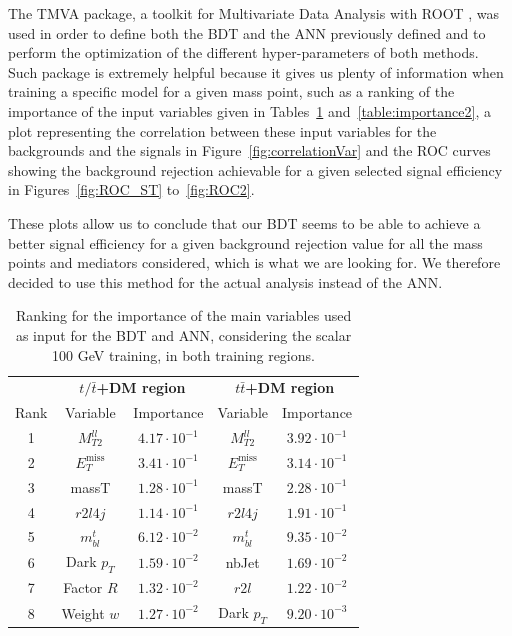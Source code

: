 \documentclass[a4paper, 10pt, openright]{report}
\begin{document}
The TMVA package, a toolkit for Multivariate Data Analysis with ROOT \cite{TMVA}, was used in order to define both the \ac{BDT} and the \ac{ANN} previously defined and to perform the optimization of the different hyper-parameters of both methods. Such package is extremely helpful because it gives us plenty of information when training a specific model for a given mass point, such as a ranking of the importance of the input variables given in Tables~\ref{table:importance1} and~\ref{table:importance2}, a plot representing the correlation between these input variables for the backgrounds and the signals in Figure~\ref{fig:correlationVar} and the \ac{ROC} curves showing the background rejection achievable for a given selected signal efficiency in Figures~\ref{fig:ROC_ST} to~\ref{fig:ROC2}. 

These plots allow us to conclude that our \ac{BDT} seems to be able to achieve a better signal efficiency for a given background rejection value for all the mass points and mediators considered, which is what we are looking for. We therefore decided to use this method for the actual analysis instead of the \ac{ANN}.

\begin{table}
\begin{center}
\begin{tabular}{ c|c|c|c|c } 
 \hline
 & \multicolumn{2}{c}{\textbf{$t/\bar t$+DM region}} & \multicolumn{2}{c}{\textbf{$t \bar t$+DM region}} \\
 Rank & Variable & Importance & Variable & Importance \\
 \hline
 1 & $M_{T2}^{ll}$ & $4.17 \cdot 10^{-1}$ & $M_{T2}^{ll}$ & $3.92 \cdot 10^{-1}$ \\
 2 & $E_{T}^{\text{miss}}$ & $3.41 \cdot 10^{-1}$ & $E_{T}^{\text{miss}}$ & $3.14 \cdot 10^{-1}$ \\
 3 & massT & $1.28 \cdot 10^{-1}$ & massT & $2.28 \cdot 10^{-1}$ \\ 
 4 & $r2l4j$ & $1.14 \cdot 10^{-1}$ & $r2l4j$ & $1.91 \cdot 10^{-1}$ \\ 
 5 & $m_{bl}^t$ & $6.12 \cdot 10^{-2}$ & $m_{bl}^t$ & $9.35 \cdot 10^{-2}$ \\
 6 & Dark $p_T$ & $1.59 \cdot 10^{-2}$ & nbJet & $1.69 \cdot 10^{-2}$ \\
 7 & Factor $R$ & $1.32 \cdot 10^{-2}$ & $r2l$ & $1.22 \cdot 10^{-2}$ \\
 8 & Weight $w$ & $1.27 \cdot 10^{-2}$ & Dark $p_T$ & $9.20 \cdot 10^{-3}$ \\
\hline
\end{tabular}
\caption{Ranking for the importance of the main variables used as input for the \ac{BDT} and \ac{ANN}, considering the scalar 100 GeV training, in both training regions.}
\label{table:importance1}
\end{center}
\end{table}
\end{document}
